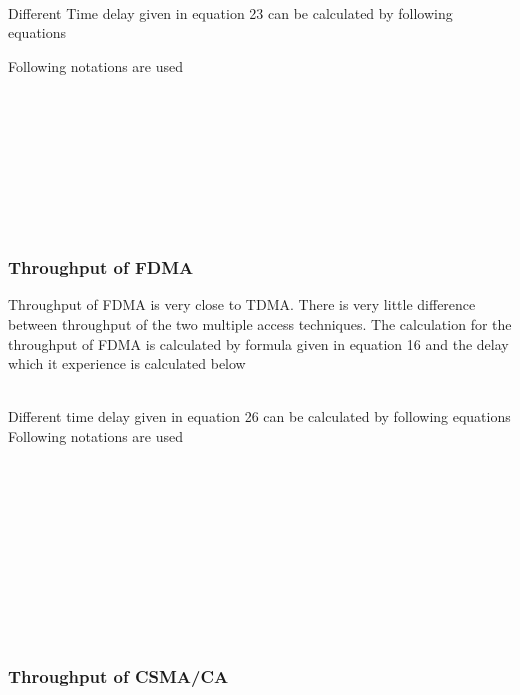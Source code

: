 \documentclass[11pt, conference, compsocconf, onecolumn]{IEEEtran}
\begin{document}
\\
Different Time delay given in equation 23 can be calculated by following equations


Following notations are used
\\\\
        
\\
    
\\
 
\\
 
\\
  
\\
  
\\
  
\\
\subsubsection{Throughput of FDMA}
Throughput of FDMA is very close to TDMA. There is very little difference between throughput of the two multiple access techniques. The calculation for the throughput of FDMA is calculated by formula given in equation 16 and the delay which it experience is calculated below

\\
Different time delay given in equation 26 can be calculated by following equations
\\


Following notations are used
\\\\
       
\\
 
\\
 
\\
 
\\
 
\\
  
\\
  
\\
  
\\
  
\\
\subsubsection{Throughput of CSMA/CA}
\end{document}

